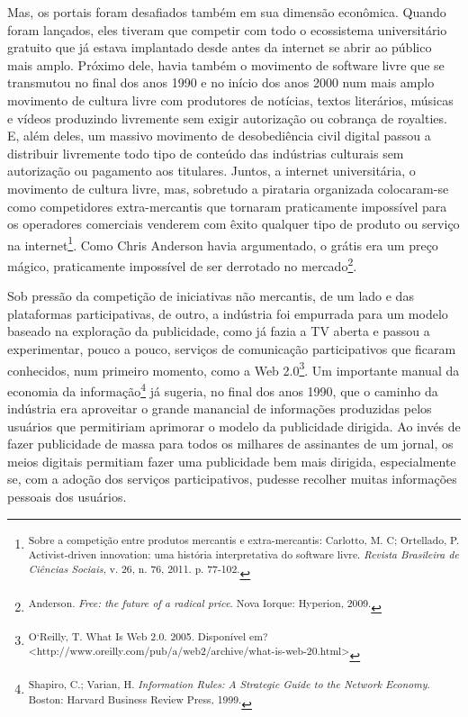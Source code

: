 Mas, os portais foram desafiados também em sua dimensão econômica.
Quando foram lançados, eles tiveram que competir com todo o ecossistema
universitário gratuito que já estava implantado desde antes da internet
se abrir ao público mais amplo. Próximo dele, havia também o movimento
de software livre que se transmutou no final dos anos 1990 e no início
dos anos 2000 num mais amplo movimento de cultura livre com produtores
de notícias, textos literários, músicas e vídeos produzindo livremente
sem exigir autorização ou cobrança de royalties. E, além deles, um
massivo movimento de desobediência civil digital passou a distribuir
livremente todo tipo de conteúdo das indústrias culturais sem
autorização ou pagamento aos titulares. Juntos, a internet
universitária, o movimento de cultura livre, mas, sobretudo a pirataria
organizada colocaram-se como competidores extra-mercantis que tornaram
praticamente impossível para os operadores comerciais venderem com êxito
qualquer tipo de produto ou serviço na internet\footnote{\textsuperscript{Sobre
  a competição entre produtos mercantis e extra-mercantis: Carlotto, M.
  C; Ortellado, P. Activist-driven innovation: uma história
  interpretativa do software livre. \emph{Revista Brasileira de Ciências
  Sociais}, v. 26, n. 76, 2011. p. 77-102.}}. Como Chris Anderson havia
argumentado, o grátis era um preço mágico, praticamente impossível de
ser derrotado no mercado\footnote{\textsuperscript{Anderson. \emph{Free:
  the future of a radical price}. Nova Iorque: Hyperion, 2009. }}.

Sob pressão da competição de iniciativas não mercantis, de um lado e das
plataformas participativas, de outro, a indústria foi empurrada para um
modelo baseado na exploração da publicidade, como já fazia a TV aberta e
passou a experimentar, pouco a pouco, serviços de comunicação
participativos que ficaram conhecidos, num primeiro momento, como a Web
2.0\footnote{\textsuperscript{O`Reilly, T. What Is Web 2.0. 2005.
  Disponível em?
  \textless{}http://www.oreilly.com/pub/a/web2/archive/what-is-web-20.html\textgreater{}}}.
Um importante manual da economia da informação\footnote{\textsuperscript{Shapiro,
  C.; Varian, H. \emph{Information Rules: A Strategic Guide to the
  Network Economy}. Boston: Harvard Business Review Press, 1999.}} já
sugeria, no final dos anos 1990, que o caminho da indústria era
aproveitar o grande manancial de informações produzidas pelos usuários
que permitiriam aprimorar o modelo da publicidade dirigida. Ao invés de
fazer publicidade de massa para todos os milhares de assinantes de um
jornal, os meios digitais permitiam fazer uma publicidade bem mais
dirigida, especialmente se, com a adoção dos serviços participativos,
pudesse recolher muitas informações pessoais dos usuários.

